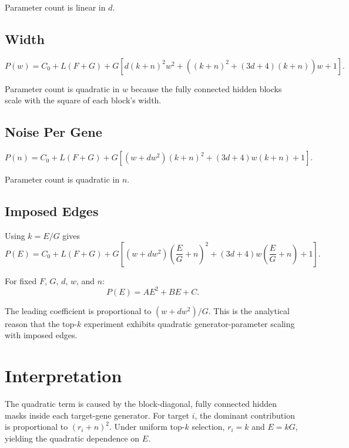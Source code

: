 \documentclass[11pt]{article}
\begin{document}
Parameter count is linear in $d$.

\subsection{Width}

\begin{equation}
\boxed{
P(w)=C_0+L(F+G)+G\left[
d(k+n)^2w^2
{}+\left((k+n)^2+(3d+4)(k+n)\right)w
{}+1
\right].
}
\end{equation}

Parameter count is quadratic in $w$ because the fully connected hidden blocks scale with the
square of each block's width.

\subsection{Noise Per Gene}

\begin{equation}
\boxed{
P(n)=C_0+L(F+G)+G\left[(w+dw^2)(k+n)^2+(3d+4)w(k+n)+1\right].
}
\end{equation}

Parameter count is quadratic in $n$.

\subsection{Imposed Edges}

Using $k=E/G$ gives
\begin{equation}
\boxed{
P(E)=C_0+L(F+G)+G\left[
 (w+dw^2)\left(\frac{E}{G}+n\right)^2
 +(3d+4)w\left(\frac{E}{G}+n\right)+1
\right].
}
\end{equation}

For fixed $F$, $G$, $d$, $w$, and $n$:
\begin{equation}
\boxed{P(E)=AE^2+BE+C.}
\end{equation}

The leading coefficient is proportional to $(w+dw^2)/G$. This is the analytical reason that
the top-$k$ experiment exhibits quadratic generator-parameter scaling with imposed edges.

\section{Interpretation}

The quadratic term is caused by the block-diagonal, fully connected hidden masks inside each
target-gene generator. For target $i$, the dominant contribution is proportional to
$(r_i+n)^2$. Under uniform top-$k$ selection, $r_i=k$ and $E=kG$, yielding the quadratic
dependence on $E$.
\end{document}

